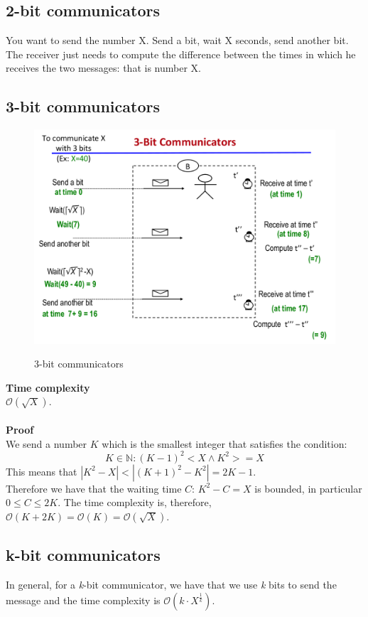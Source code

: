 \documentclass[paper=a4, fontsize=11pt]{scrartcl} %
\numberwithin{equation}{section} %
\numberwithin{figure}{section} %
\numberwithin{table}{section} %
\begin{document}
\subsection*{2-bit communicators}
You want to send the number X. Send a bit, wait X seconds, send another bit.
The receiver just needs to compute the difference between the times in which he receives the two messages: that is number X.

\subsection*{3-bit communicators}
\begin{figure}[H]
	\centering
	\includegraphics[width=0.85\linewidth]{img/3_bit_communication}
	\caption[3-bit communicators]{3-bit communicators}
	\caption{}
	\label{fig:3bitcommunication}
\end{figure}
\textbf{Time complexity} \\
$\mathcal{O}(\sqrt X)$.
\\ \\ \textbf{Proof} \\
We send a number $K$ which is the smallest integer that satisfies the condition: $$ K \in \mathbb{N} : (K-1)^2 < X \land K^2 >= X$$
This means that $|K^2 - X| < |(K+1)^2 - K^2| = 2K - 1$. \\Therefore we have that the waiting time $C :\, K^2 - C = X$ is bounded, in particular $0 \le C \le 2K$. The time complexity is, therefore, $\mathcal{O}(K + 2K) = \mathcal{O}(K) = \mathcal{O}(\sqrt X)$.

\subsection*{k-bit communicators}
In general, for a \textit{k}-bit communicator, we have that we use \textit{k} bits to send the message and the time complexity is $\mathcal{O}(k\cdot X^{\frac{1}{k}})$.
\end{document}
